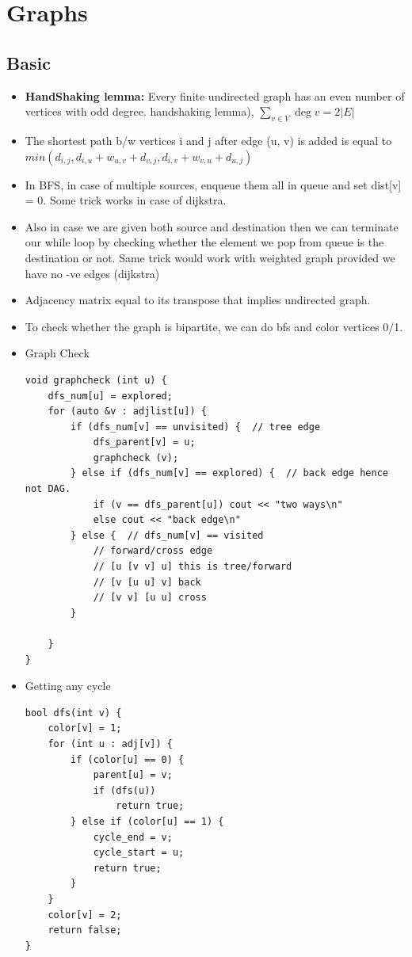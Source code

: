 \documentclass[8pt, a4paper, oneside, twocolumn]{extarticle}
\begin{document}
\section{Graphs}
\subsection{Basic}
\begin{itemize}
    \item \textbf{HandShaking lemma: }Every finite undirected graph has an even number of vertices with odd degree. handshaking lemma), $\sum _{v\in V}\deg v=2|E|$    
    \item The shortest path b/w vertices i and j after edge (u, v) is added is equal to $min(d_{i, j}, d_{i, u} + w_{u, v} + d_{v, j}, d_{i, v} + w_{v, u} + d_{u, j})$
    \item In BFS, in case of multiple sources, enqueue them all in queue and set dist[v] = 0. Some trick works in case of dijkstra.
    \item Also in case we are given both source and destination then we can terminate our while loop by checking whether the element we pop from queue is the destination or not. Same trick would work with weighted graph provided we have no -ve edges (dijkstra)
    \item Adjacency matrix equal to its transpose that implies undirected graph.
    \item To check whether the graph is bipartite, we can do bfs and color vertices 0/1.
    \item Graph Check
    \begin{verbatim}
void graphcheck (int u) {
    dfs_num[u] = explored;
    for (auto &v : adjlist[u]) {
        if (dfs_num[v] == unvisited) {  // tree edge
            dfs_parent[v] = u;
            graphcheck (v);
        } else if (dfs_num[v] == explored) {  // back edge hence not DAG.
            if (v == dfs_parent[u]) cout << "two ways\n"
            else cout << "back edge\n"
        } else {  // dfs_num[v] == visited
            // forward/cross edge
            // [u [v v] u] this is tree/forward
            // [v [u u] v] back
            // [v v] [u u] cross
        }

    }
}
    \end{verbatim}
    \item Getting any cycle
\begin{verbatim}
bool dfs(int v) {
    color[v] = 1;
    for (int u : adj[v]) {
        if (color[u] == 0) {
            parent[u] = v;
            if (dfs(u))
                return true;
        } else if (color[u] == 1) {
            cycle_end = v;
            cycle_start = u;
            return true;
        }
    }
    color[v] = 2;
    return false;
}


\end{verbatim}
\end{itemize}
\end{document}
